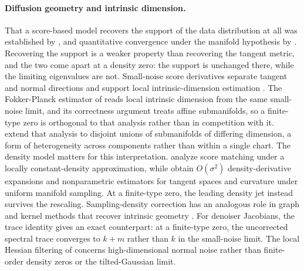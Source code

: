\documentclass[10pt]{article}
\theoremstyle{c2fup}
\begin{document}
\paragraph{Diffusion geometry and intrinsic dimension.}
That a score-based model recovers the support of the data distribution at all was established by \citet{pidstrigach2022score}, and quantitative convergence under the manifold hypothesis by \citet{debortoli2022convergence}.  Recovering the support is a weaker property than recovering the tangent metric, and the two come apart at a density zero: the support is unchanged there, while the limiting eigenvalues are not.  Small-noise score derivatives separate tangent and normal directions and support local intrinsic-dimension estimation \citep{stanczuk2024diffusion,ventura2025manifolds,osada2026local}.  The Fokker-Planck estimator of \citet{kamkari2024geometric} reads local intrinsic dimension from the same small-noise limit, and its correctness argument treats affine submanifolds, so a finite-type zero is orthogonal to that analysis rather than in competition with it.  \citet{leung2025convolutions} extend that analysis to disjoint unions of submanifolds of differing dimension, a form of heterogeneity across components rather than within a single chart.  The density model matters for this interpretation.  \citet{yeats2025connection} analyze score matching under a locally constant-density approximation, while \citet{chen2026riemannian} obtain $O(\sigma^2)$ density-derivative expansions and nonparametric estimators for tangent spaces and curvature under uniform manifold sampling.  At a finite-type zero, the leading density jet instead survives the rescaling.  Sampling-density correction has an analogous role in graph and kernel methods that recover intrinsic geometry \citep{coifman2006diffusion,berry2016variable}.  For denoiser Jacobians, the trace identity gives an exact counterpart: at a finite-type zero, the uncorrected spectral trace converges to $k+m$ rather than $k$ in the small-noise limit.  The local Hessian filtering of \citet{osada2026local} concerns high-dimensional normal noise rather than finite-order density zeros or the tilted-Gaussian limit.
\end{document}
